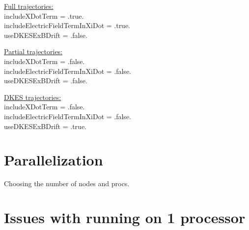 {\setlength{\parindent}{0cm}

\underline{Full trajectories:}\\
{\ttfamily 
includeXDotTerm = .true.\\
includeElectricFieldTermInXiDot = .true.\\
useDKESExBDrift = .false.\\
}

\underline{Partial trajectories:}\\
{\ttfamily
includeXDotTerm = .false.\\
includeElectricFieldTermInXiDot = .false.\\
useDKESExBDrift = .false.\\
}

\underline{DKES trajectories:}\\
{\ttfamily
includeXDotTerm = .false.\\
includeElectricFieldTermInXiDot = .false.\\
useDKESExBDrift = .true.\\
}
}

\section{Parallelization}
Choosing the number of nodes and procs.

\section{Issues with running on 1 processor}

